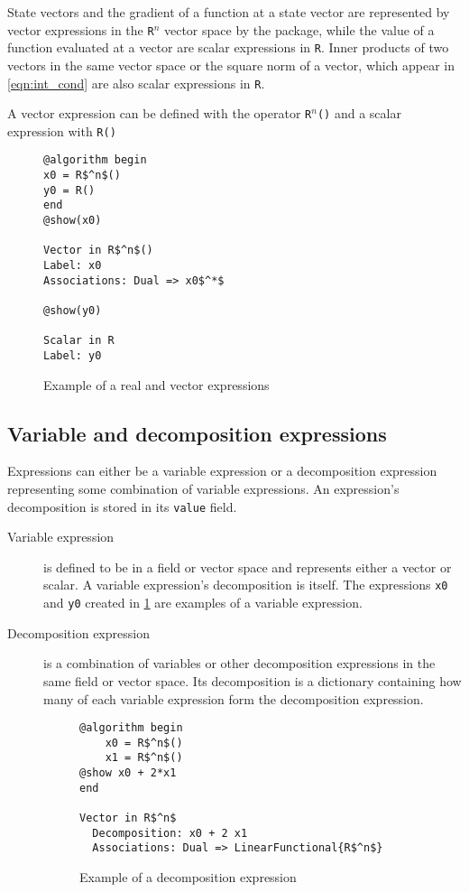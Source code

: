 State vectors and the gradient of a function at a state vector are represented by vector expressions in the \texttt{R$^n$} vector space by the package, while the value of a function evaluated at a vector are scalar expressions in \texttt{R}. Inner products of two vectors in the same vector space or the square norm of a vector, which appear in \eqref{eqn:int_cond} are also scalar expressions in \texttt{R}.

A vector expression can be defined with the operator \texttt{R$^n$()} and a scalar expression with \texttt{R()}

\begin{figure}[h]
	\begin{lstlisting}[mathescape]
@algorithm begin
x0 = R$^n$()
y0 = R()
end
@show(x0)

Vector in R$^n$()
Label: x0
Associations: Dual => x0$^*$

@show(y0)

Scalar in R
Label: y0
	\end{lstlisting}
\caption{Example of a real and vector expressions}
\label{ex_field}
\end{figure}

\subsection*{Variable and decomposition expressions}
Expressions can either be a variable expression or a decomposition expression representing some combination of variable expressions. An expression's decomposition is stored in its \texttt{value} field.
\begin{description}
	\item[Variable expression] is defined to be in a field or vector space and represents either a vector or scalar. A variable expression's decomposition is itself. The expressions \texttt{x0} and \texttt{y0} created in \cref{ex_field} are examples of a variable expression.

	\item[Decomposition expression] is a combination of variables or other decomposition expressions in the same field or vector space. Its decomposition is a dictionary containing how many of each variable expression form the decomposition expression.

\begin{figure}[h]
		\begin{lstlisting}[mathescape]
@algorithm begin
	x0 = R$^n$()
	x1 = R$^n$()
@show x0 + 2*x1
end

Vector in R$^n$
  Decomposition: x0 + 2 x1
  Associations: Dual => LinearFunctional{R$^n$}
		\end{lstlisting}
	\caption{Example of a decomposition expression}
	\label{ex_decomposition}
\end{figure}
\end{description}

